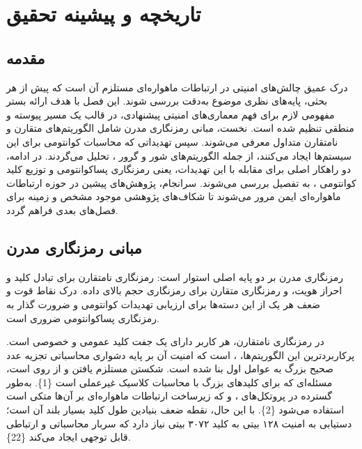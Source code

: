 \documentclass[a4paper,14pt]{extreport}
\begin{document}
\chapter{تاریخچه و پیشینه تحقیق}
\setcounter{figure}{0}
\setcounter{table}{0}
\setcounter{equation}{0}

\section{مقدمه}

درک عمیق چالش‌های امنیتی در ارتباطات ماهواره‌ای مستلزم آن است که پیش از هر بحثی، پایه‌های نظری موضوع به‌دقت بررسی شوند. این فصل با هدف ارائه بستر مفهومی لازم برای فهم معماری‌های امنیتی پیشنهادی، در قالب یک مسیر پیوسته و منطقی تنظیم شده است. نخست، مبانی رمزنگاری مدرن  شامل الگوریتم‌های متقارن و نامتقارن متداول معرفی می‌شوند. سپس تهدیداتی که محاسبات کوانتومی  برای این سیستم‌ها ایجاد می‌کنند، از جمله الگوریتم‌های شور  و گرور ، تحلیل می‌گردند. در ادامه، دو راهکار اصلی برای مقابله با این تهدیدات، یعنی رمزنگاری پساکوانتومی  و توزیع کلید کوانتومی ، به تفصیل بررسی می‌شوند. سرانجام، پژوهش‌های پیشین در حوزه ارتباطات ماهواره‌ای ایمن مرور می‌شوند تا شکاف‌های پژوهشی  موجود مشخص و زمینه برای فصل‌های بعدی فراهم گردد.

\section{مبانی رمزنگاری مدرن}

رمزنگاری مدرن  بر دو پایه اصلی استوار است: رمزنگاری نامتقارن  برای تبادل کلید و احراز هویت، و رمزنگاری متقارن  برای رمزنگاری حجم بالای داده. درک نقاط قوت و ضعف هر یک از این دسته‌ها برای ارزیابی تهدیدات کوانتومی و ضرورت گذار به رمزنگاری پساکوانتومی ضروری است.

در رمزنگاری نامتقارن، هر کاربر دارای یک جفت کلید عمومی  و خصوصی  است. پرکاربردترین این الگوریتم‌ها، ، است که امنیت آن بر پایه دشواری محاسباتی تجزیه عدد صحیح بزرگ  به عوامل اول بنا شده است. شکستن  مستلزم یافتن  و  از روی  است، مسئله‌ای که برای کلیدهای بزرگ با محاسبات کلاسیک غیرعملی است \{1\}.  به‌طور گسترده در پروتکل‌های ،  و  که زیرساخت ارتباطات ماهواره‌ای بر آن‌ها متکی است استفاده می‌شود \{2\}. با این حال، نقطه ضعف بنیادین  طول کلید بسیار بلند آن است؛ دستیابی به امنیت ۱۲۸ بیتی به کلید ۳۰۷۲ بیتی نیاز دارد که سربار محاسباتی و ارتباطی قابل توجهی ایجاد می‌کند \{22\}.
\end{document}
